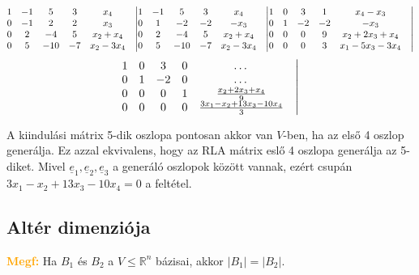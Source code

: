 \documentclass[../szamtud.tex]{subfiles}
\begin{document}
        \[
            \begin{matrix}
                1 & -1 & 5 & 3 & x_4 & \bigm| \\
                0 & -1 & 2 & 2 & x_3 & \bigm| \\
                0 & 2 & -4 & 5 & x_2+x_4 & \bigm| \\
                0 & 5 & -10 & -7 & x_2-3x_4 & \bigm| 
            \end{matrix} 
            \begin{matrix}
                1 & -1 & 5 & 3 & x_4 & \bigm| \\
                0 & 1 & -2 & -2 & -x_3 & \bigm| \\
                0 & 2 & -4 & 5 & x_2+x_4 & \bigm| \\
                0 & 5 & -10 & -7 & x_2-3x_4 & \bigm| 
            \end{matrix} 
            \begin{matrix}
                1 & 0 & 3 & 1 & x_4-x_3 & \bigm| \\
                0 & 1 & -2 & -2 & -x_3 & \bigm| \\
                0 & 0 & 0 & 9 & x_2+2x_3+x_4 & \bigm| \\
                0 & 0 & 0 & 3 & x_1-5x_3-3x_4 & \bigm| 
            \end{matrix} 
        \]
        \[
            \begin{matrix}
                1 & 0 & 3 & 0 & \dots  & \bigm| \\
                0 & 1 & -2 & 0 & \dots & \bigm| \\
                0 & 0 & 0 & 1 & \frac{x_2+2x_3+x_4}{9} & \bigm| \\
                0 & 0 & 0 & 0 & \frac{3x_1-x_2+13x_3-10x_4}{3} & \bigm| 
            \end{matrix} 
        \]

        A kiindulási mátrix 5-dik oszlopa pontosan akkor van $V$-ben, ha az első 4 oszlop generálja. Ez azzal ekvivalens, hogy az RLA mátrix eslő 4 oszlopa generálja az 5-diket. Mivel $\underline{e}_1, \underline{e}_2, \underline{e}_3$ a generáló oszlopok között vannak, ezért csupán $3x_1-x_2+13x_3-10x_4 = 0$ a feltétel.

    \subsection{Altér dimenziója}

        \textcolor{orange}{\textbf{Megf:}} Ha $B_1$ és $B_2$ a $V \leq \mathbb{R}^n$ bázisai, akkor $|B_1| = |B_2|$.
\end{document}
